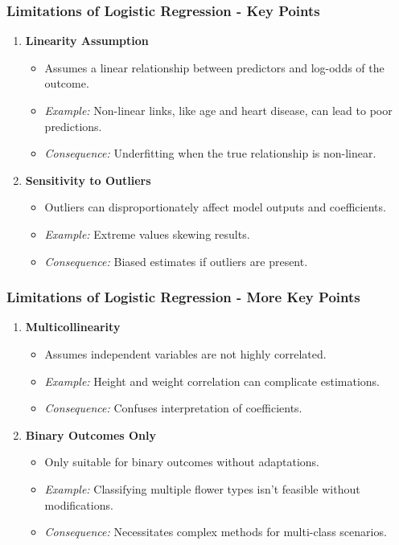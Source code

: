 \documentclass[aspectratio=169]{beamer}
\begin{document}
\begin{frame}[fragile]
    \frametitle{Limitations of Logistic Regression - Key Points}
    \begin{enumerate}
        \item \textbf{Linearity Assumption}
        \begin{itemize}
            \item Assumes a linear relationship between predictors and log-odds of the outcome.
            \item \textit{Example:} Non-linear links, like age and heart disease, can lead to poor predictions.
            \item \textit{Consequence:} Underfitting when the true relationship is non-linear.
        \end{itemize}
        
        \item \textbf{Sensitivity to Outliers}
        \begin{itemize}
            \item Outliers can disproportionately affect model outputs and coefficients.
            \item \textit{Example:} Extreme values skewing results.
            \item \textit{Consequence:} Biased estimates if outliers are present.
        \end{itemize}
    \end{enumerate}
\end{frame}

\begin{frame}[fragile]
    \frametitle{Limitations of Logistic Regression - More Key Points}
    \begin{enumerate}[resume]
        \item \textbf{Multicollinearity}
        \begin{itemize}
            \item Assumes independent variables are not highly correlated.
            \item \textit{Example:} Height and weight correlation can complicate estimations.
            \item \textit{Consequence:} Confuses interpretation of coefficients.
        \end{itemize}
        
        \item \textbf{Binary Outcomes Only}
        \begin{itemize}
            \item Only suitable for binary outcomes without adaptations.
            \item \textit{Example:} Classifying multiple flower types isn’t feasible without modifications.
            \item \textit{Consequence:} Necessitates complex methods for multi-class scenarios.
        \end{itemize}
    \end{enumerate}
\end{frame}
\end{document}
